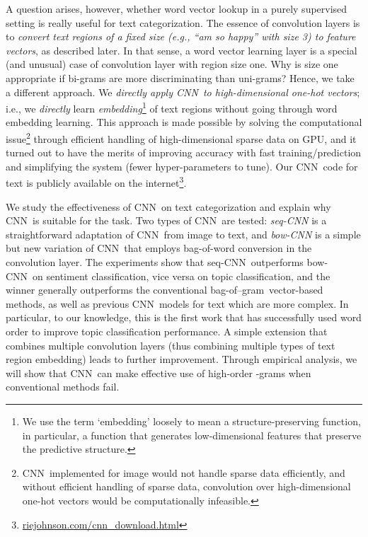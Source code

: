 \documentclass[11pt,letterpaper]{article}
\newcommand{\cnn}{CNN}
\newcommand{\scnn}{seq-CNN}
\newcommand{\bcnn}{bow-CNN}
\newcommand{\bongram}{bag-of--gram}
\begin{document}
A question arises, however, whether word vector lookup in a purely supervised setting 
is really useful for text categorization.  
The essence of convolution layers is to {\em convert text regions 
of a fixed size (e.g., ``am so happy'' with size 3) to feature vectors}, as described later. 
In that sense, a word vector learning layer is a special (and unusual) case of convolution layer with 
region size one.  
Why is size one appropriate if bi-grams are more discriminating than uni-grams? 
Hence, we take a different approach.  
We {\em directly apply \cnn\ to high-dimensional one-hot vectors};  
i.e., we {\em directly} learn {\em embedding}\footnote{
  We use the term `embedding' loosely to mean a structure-preserving function, 
  in particular, a function that generates low-dimensional features 
  that preserve the predictive structure. 
} of text regions without going through word embedding learning.  
This approach is made possible by solving the computational issue\footnote{
  \cnn\ implemented for image would not handle sparse data efficiently, and 
  without efficient handling of sparse data, 
  convolution over high-dimensional one-hot vectors would be computationally infeasible. 
}
through efficient handling of high-dimensional sparse data 
on GPU, and 
it turned out to have the merits of 
improving accuracy 
with fast training/prediction 
and simplifying the system (fewer hyper-parameters to tune).  
Our 
\cnn\ code for text is publicly available on the internet\footnote{
  \url{riejohnson.com/cnn_download.html}
}.  

We 
study the effectiveness of \cnn\
on text categorization and explain why \cnn\ is suitable for the task.  
Two types of \cnn\ are tested: 
{\em \scnn} is a straightforward adaptation of \cnn\ from image to text, and 
{\em \bcnn} is a simple but new variation of \cnn\ that employs bag-of-word conversion 
in the convolution layer.  
The experiments show that \scnn\ outperforms \bcnn\ on sentiment classification, 
vice versa on topic classification, 
and the winner generally outperforms the conventional \bongram\ vector-based methods, as well as 
previous \cnn\ models for text which are more complex. 
In particular, to our knowledge, this is the first work that has successfully used 
word order to improve topic classification performance.  
A simple extension that combines multiple convolution layers (thus 
combining multiple types of text region embedding) 
leads to further improvement.  
Through empirical analysis, we will show that 
\cnn\ can make effective use of high-order -grams when conventional methods fail.  
\end{document}

